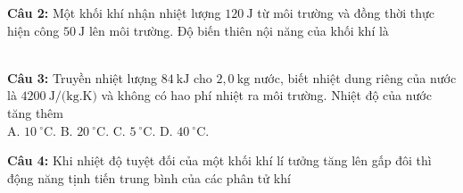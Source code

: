 \documentclass[12pt,a4paper]{article}
\begin{document}
\begin{minipage}{\textwidth}
\noindent \textbf{Câu 2:} Một khối khí nhận nhiệt lượng $120\ \text{J}$ từ môi trường và đồng thời thực hiện công $50\ \text{J}$ lên môi trường. Độ biến thiên nội năng của khối khí là\\
\noindent{}\\
\noindent{}
\end{minipage}


\begin{minipage}{\textwidth}
\noindent \textbf{Câu 3:} Truyền nhiệt lượng $84\ \text{kJ}$ cho $2{,}0\ \text{kg}$ nước, biết nhiệt dung riêng của nước là $4200\ \text{J/(kg.K)}$ và không có hao phí nhiệt ra môi trường. Nhiệt độ của nước tăng thêm\\
\noindent A. $10\ ^{\circ}\text{C}$. \hfill B. $20\ ^{\circ}\text{C}$. \hfill C. $5\ ^{\circ}\text{C}$. \hfill D. $40\ ^{\circ}\text{C}$.
\end{minipage}


\begin{minipage}{\textwidth}
\noindent \textbf{Câu 4:} Khi nhiệt độ tuyệt đối của một khối khí lí tưởng tăng lên gấp đôi thì động năng tịnh tiến trung bình của các phân tử khí\\
\noindent{}\\
\noindent{}
\end{minipage}
\end{document}
